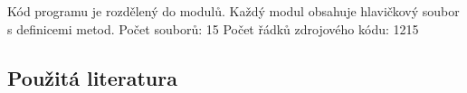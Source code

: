 \documentclass[a4paper,11pt]{article}
\begin{document}
Kód programu je rozdělený do modulů. Každý modul obsahuje hlavičkový soubor s definicemi metod. \newline\newline
Počet souborů: 15 \newline
Počet řádků zdrojového kódu: 1215

\subsection{Použitá literatura}

\nocite{*}




\newpage
\thispagestyle{empty}
\end{document}
